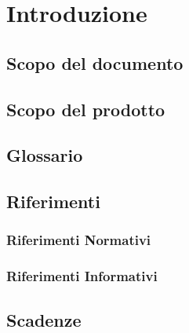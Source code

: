 \documentclass[PianoDiProgetto.tex]{subfiles}
\begin{document}
\chapter{Introduzione}

\section{Scopo del documento}

\section{Scopo del prodotto}

\section{Glossario}

\section{Riferimenti}
\subsection{Riferimenti Normativi}
\subsection{Riferimenti Informativi}

\section{Scadenze}
\end{document}

